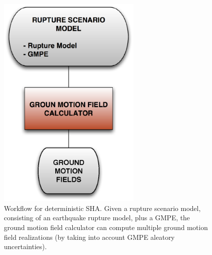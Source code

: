 \begin{figure}[htbp]
\begin{center}
\includegraphics[width=7cm]{./Figures/Part_Hazard/deterministic_workflow.eps}
\caption{Workflow for deterministic SHA. Given a rupture scenario model, consisting of an earthquake rupture model, plus a GMPE, the ground motion field calculator can compute multiple ground motion field realizations (by taking into account GMPE aleatory uncertainties).}
\label{deterministic_workflow}
\end{center}
\end{figure}

